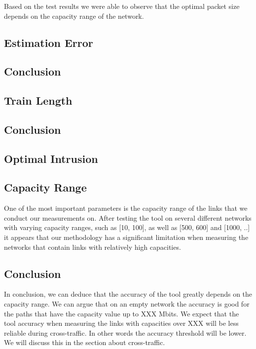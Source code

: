 Based on the test results we were able to observe that the optimal packet size depends on the capacity range of the network. 

\subsection*{Estimation Error}

\subsection*{Conclusion}

\subsection{Train Length}

\subsection*{Conclusion}


\subsection{Optimal Intrusion}

\subsection{Capacity Range}
One of the most important parameters is the capacity range of the links that we conduct our measurements on. After testing the tool on several different networks with varying capacity ranges, such as [10, 100], as well as [500, 600] and [1000, ..] it appears that our methodology has a significant limitation when measuring the networks that contain links with relatively high capacities. 

\subsection*{Conclusion}
In conclusion, we can deduce that the accuracy of the tool greatly depends on the capacity range. We can argue that on an empty network the accuracy is good for the paths that have the capacity value up to XXX Mbits. We expect that the tool accuracy when measuring the links with capacities over XXX will be less reliable during cross-traffic. In other words the accuracy threshold will be lower. We will discuss this in the section about cross-traffic.


